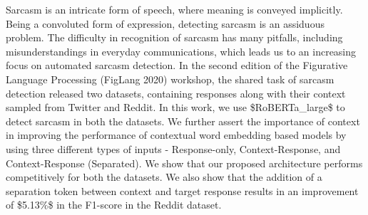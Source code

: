 Sarcasm is an intricate form of speech, where meaning is conveyed implicitly. Being a convoluted form of expression, detecting sarcasm is an assiduous problem. The difficulty in recognition of sarcasm has many pitfalls, including misunderstandings in everyday communications, which leads us to an increasing focus on automated sarcasm detection. In the second edition of the Figurative Language Processing (FigLang 2020) workshop, the shared task of sarcasm detection released two datasets, containing responses along with their context sampled from Twitter and Reddit. In this work, we use \$RoBERTa\_{large}\$ to detect sarcasm in both the datasets. We further assert the importance of context in improving the performance of contextual word embedding based models by using three different types of inputs - Response-only, Context-Response, and Context-Response (Separated). We show that our proposed architecture performs competitively for both the datasets. We also show that the addition of a separation token between context and target response results in an improvement of \$5.13\%\$ in the F1-score in the Reddit dataset.
